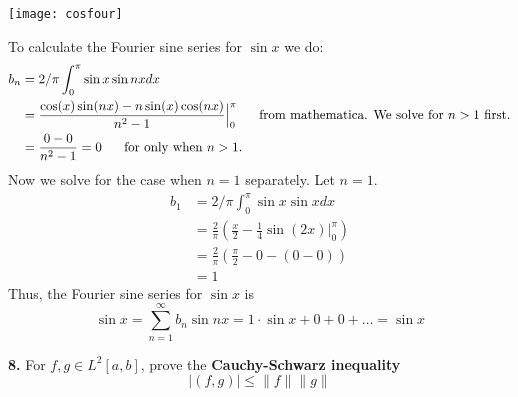 \documentclass{article}
\begin{document}
\texttt{[image: cosfour]}


To calculate the Fourier sine series for \(\sin x\) we do:
\begin{align*}
b_n&= 2/\pi \int_0^\pi \sin x \sin nx dx \\
&= \frac{\cos (x) \sin (n x)-n \sin (x) \cos (n x)}{n^2-1}
\Big|_0^{\pi}  \hspace{6mm} \text{from mathematica. We solve for \(n>1\) first.} \\
&= \frac{0-0}{n^2-1}   = 0 \hspace{6mm} \text{for only when \(n>1\). }
\end{align*}
Now we solve for the case when \(n=1\) separately. Let \(n=1\). 
\begin{align*}
b_1&= 2/\pi \int_0^\pi \sin x \sin x dx \\
&= \frac{2}{\pi} (\frac{x}{2}-\frac{1}{4} \sin (2 x)\Big|_0^\pi) \\
&= \frac{2}{\pi} (\frac{\pi}{2}-0-(0-0))\\
&=1
\end{align*}
Thus, the Fourier sine series for \(\sin x\) is 
\[ \sin x = \sum_{n=1}^\infty b_n \sin nx = 1\cdot \sin x + 0 + 0+ \ldots  = \sin x \]

\newpage

\textbf{8.} For \(f,g\in L^2[a,b]\), prove the \textbf{Cauchy-Schwarz inequality}
\[
| (f,g) | \leq \|f\| \|g\|
\]
\end{document}
